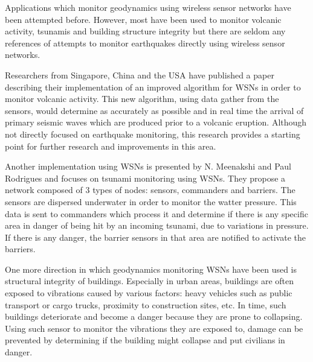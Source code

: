 Applications which monitor geodynamics using wireless sensor networks have been attempted before. However, most have been used to
monitor volcanic activity, tsunamis and building structure integrity but there are seldom any references of attempts to monitor 
earthquakes directly using wireless sensor networks.

Researchers from Singapore, China and the USA have published a paper describing their implementation of an improved algorithm 
for WSNs in order to monitor volcanic activity. This new algorithm, using data gather from the sensors, would determine as accurately as 
possible and in real time the arrival of primary seismic waves which are produced prior to a volcanic eruption. Although not 
directly focused on earthquake monitoring, this research provides a starting point for further research and improvements in 
this area.

Another implementation using WSNs is presented by N. Meenakshi and Paul Rodrigues and focuses on tsunami monitoring using WSNs. 
They propose a network composed of 3 types of nodes: sensors, commanders and barriers. The sensors are dispersed underwater 
in order to monitor the watter pressure. This data is sent to commanders which process it and determine if there is any specific area in danger 
of being hit by an incoming tsunami, due to variations in pressure. If there is any danger, the barrier sensors in 
that area are notified to activate the barriers.

One more direction in which geodynamics monitoring WSNs have been used is structural integrity of buildings. Especially in urban 
areas, buildings are often exposed to vibrations caused by various factors: heavy vehicles such as
public transport or cargo trucks, 
proximity to construction sites, etc. In time, such buildings deteriorate and become a danger because they are prone to collapsing. 
Using such sensor to monitor the vibrations they are exposed to, damage can be prevented by
determining if the building might collapse and put civilians in danger.
